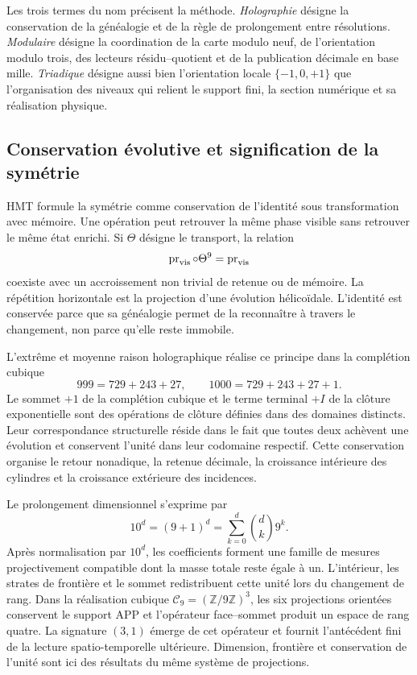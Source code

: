Les trois termes du nom précisent la méthode. \emph{Holographie} désigne
la conservation de la généalogie et de la règle de prolongement entre
résolutions. \emph{Modulaire} désigne la coordination de la carte modulo neuf,
de l'orientation modulo trois, des lecteurs résidu--quotient et de la publication
décimale en base mille. \emph{Triadique} désigne aussi bien l'orientation locale
\(\{-1,0,+1\}\) que l'organisation des niveaux qui relient le support
fini, la section numérique et sa réalisation physique.

\subsection*{Conservation évolutive et signification de la symétrie}

HMT formule la symétrie comme conservation de l'identité sous transformation
avec mémoire. Une opération peut retrouver la même phase visible sans
retrouver le même état enrichi. Si \(\Theta\) désigne le transport,
la relation
\[
 \operatorname{pr}_{\rm vis}\circ\Theta^9
 =\operatorname{pr}_{\rm vis}
\]
coexiste avec un accroissement non trivial de retenue ou de mémoire. La répétition
horizontale est la projection d'une évolution hélicoïdale. L'identité est
conservée parce que sa généalogie permet de la reconnaître à travers le changement, non
parce qu'elle reste immobile.

L'extrême et moyenne raison holographique réalise ce principe dans la
complétion cubique
\[
 999=729+243+27,\qquad
 1000=729+243+27+1.
\]
Le sommet \(+1\) de la complétion cubique et le terme terminal \(+I\) de la
clôture exponentielle sont des opérations de clôture définies dans des domaines
distincts. Leur correspondance structurelle réside dans le fait que toutes deux achèvent une
évolution et conservent l'unité dans leur codomaine respectif. Cette conservation
organise le retour nonadique, la retenue décimale, la croissance intérieure des
cylindres et la croissance extérieure des incidences.

Le prolongement dimensionnel s'exprime par
\[
 10^d=(9+1)^d=\sum_{k=0}^{d}\binom dk9^k.
\]
Après normalisation par \(10^d\), les coefficients forment une famille de mesures
projectivement compatible dont la masse totale reste égale à un.
L'intérieur, les strates de frontière et le sommet redistribuent cette unité lors du
changement de rang. Dans la réalisation cubique
\(\mathcal C_9=(\mathbb Z/9\mathbb Z)^3\), les six projections orientées
conservent le support APP et l'opérateur face--sommet produit un espace de
rang quatre. La signature \((3,1)\) émerge de cet opérateur et fournit
l'antécédent fini de la lecture spatio-temporelle ultérieure. Dimension,
frontière et conservation de l'unité sont ici des résultats du même système
de projections.

